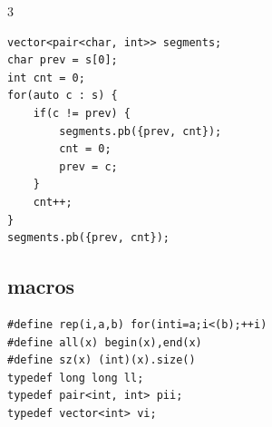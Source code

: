 \documentclass[twoside]{article}
\begin{document}
\begin{multicols*}{3}
\begin{verbatim}
vector<pair<char, int>> segments;
char prev = s[0];
int cnt = 0;
for(auto c : s) {
    if(c != prev) {
        segments.pb({prev, cnt});
        cnt = 0;
        prev = c;
    }
    cnt++;
}
segments.pb({prev, cnt});

\end{verbatim}

{
\subsection*{macros}
}
\begin{verbatim}
#define rep(i,a,b) for(inti=a;i<(b);++i)
#define all(x) begin(x),end(x)
#define sz(x) (int)(x).size()
typedef long long ll;
typedef pair<int, int> pii;
typedef vector<int> vi;
\end{verbatim}

\end{multicols*}
\end{document}
